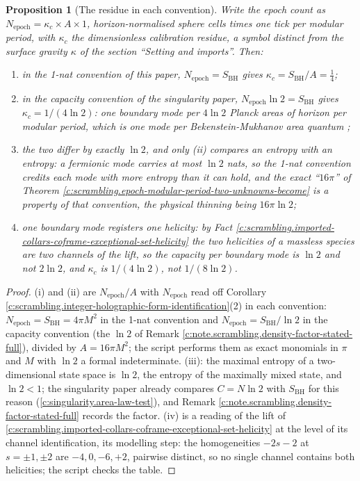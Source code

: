 \documentclass[11pt]{article}
\newtheorem{proposition}[theorem]{Proposition}
\theoremstyle{definition}
\theoremstyle{plain}
\newcommand{\changedmark}[2]{\marginpar{\raggedright\scriptsize\color{#1}#2}}
\providecommand{\SBH}{}\renewcommand{\SBH}{S_{\mathrm{BH}}}
\begin{document}
\begin{proposition}[The residue in each convention]\label{c:scrambling.residue-each-convention}
\changedmark{gray}{reworded}
Write the epoch count as $N_{\mathrm{epoch}} = \kappa_c \times A \times 1$, horizon-normalised sphere cells times one tick per modular period, with $\kappa_c$ the dimensionless \emph{calibration residue}, a symbol distinct from the surface gravity $\kappa$ of the section ``Setting and imports''. Then:
\begin{enumerate}
\item[(i)] in the 1-nat convention of this paper, $N_{\mathrm{epoch}} = \SBH$ gives $\kappa_c = \SBH/A = \tfrac14$;
\item[(ii)] in the capacity convention of the singularity paper, $N_{\mathrm{epoch}}\ln 2 = \SBH$ gives $\kappa_c = 1/(4\ln 2)$: one boundary mode per $4\ln 2$ Planck areas of horizon per modular period, which is one mode per Bekenstein-Mukhanov area quantum \cite{BekensteinMukhanov1995};
\item[(iii)] the two differ by exactly $\ln 2$, and only (ii) compares an entropy with an entropy: a fermionic mode carries at most $\ln 2$ nats, so the 1-nat convention credits each mode with more entropy than it can hold, and the exact ``$16\pi$'' of Theorem \ref{c:scrambling.epoch-modular-period-two-unknowns-become} is a property of that convention, the physical thinning being $16\pi\ln 2$;
\item[(iv)] one boundary mode registers one helicity: by Fact \ref{c:scrambling.imported-collars-coframe-exceptional-set-helicity} the two helicities of a massless species are two channels of the lift, so the capacity per boundary mode is $\ln 2$ and not $2\ln 2$, and $\kappa_c$ is $1/(4\ln 2)$, not $1/(8\ln 2)$.
\end{enumerate}
\end{proposition}
\begin{proof}
(i) and (ii) are $N_{\mathrm{epoch}}/A$ with $N_{\mathrm{epoch}}$ read off Corollary \ref{c:scrambling.integer-holographic-form-identification}(2) in each convention: $N_{\mathrm{epoch}} = \SBH = 4\pi M^2$ in the 1-nat convention and $N_{\mathrm{epoch}} = \SBH/\ln 2$ in the capacity convention (the $\ln 2$ of Remark \ref{c:note.scrambling.density-factor-stated-full}), divided by $A = 16\pi M^2$; the script performs them as exact monomials in $\pi$ and $M$ with $\ln 2$ a formal indeterminate. (iii): the maximal entropy of a two-dimensional state space is $\ln 2$, the entropy of the maximally mixed state, and $\ln 2 < 1$; the singularity paper already compares $C = N\ln 2$ with $\SBH$ for this reason \cite[Prop.~10.7]{ButlerT5} (\ref{c:singularity.area-law-test}), and Remark \ref{c:note.scrambling.density-factor-stated-full} records the factor. (iv) is a reading of the lift of \ref{c:scrambling.imported-collars-coframe-exceptional-set-helicity} at the level of its channel identification, its modelling step: the homogeneities $-2s - 2$ at $s = \pm 1, \pm 2$ are $-4, 0, -6, +2$, pairwise distinct, so no single channel contains both helicities; the script checks the table.

\end{proof}
\end{document}
